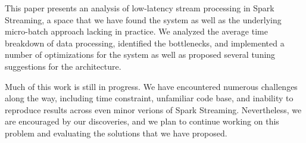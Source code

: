 This paper presents an analysis of low-latency stream processing in Spark Streaming, a space that we have found the system as well as the underlying micro-batch approach lacking in practice.
We analyzed the average time breakdown of data processing, identified the bottlenecks, and implemented a number of optimizations for the system as well as proposed several tuning suggestions for the architecture.

Much of this work is still in progress. We have encountered numerous challenges along the way, including time constraint, unfamiliar code base, and inability to reproduce results across even minor verions of Spark Streaming. Nevertheless, we are encouraged by our discoveries, and we plan to continue working on this problem and evaluating the solutions that we have proposed. 
